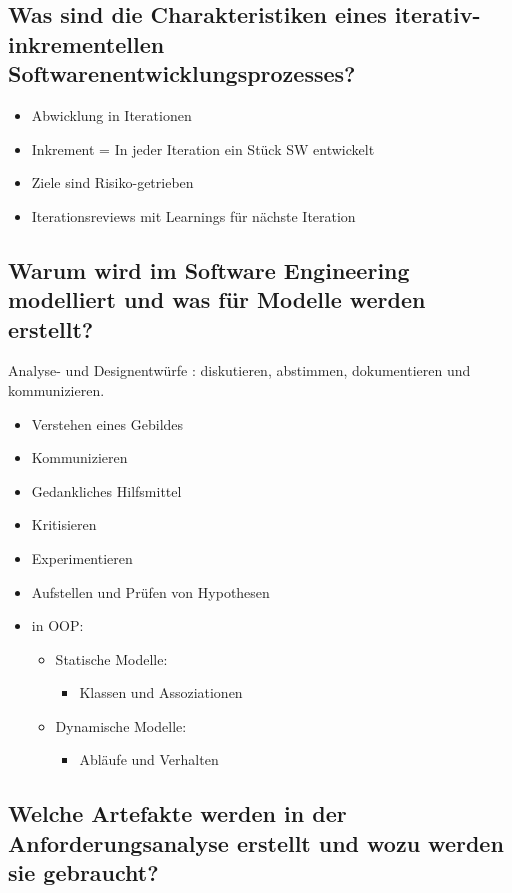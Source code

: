 \documentclass{article}
\begin{document}
\subsection{Was sind die Charakteristiken eines iterativ-inkrementellen Softwarenentwicklungsprozesses?}
\begin{itemize}
	\item Abwicklung in Iterationen
	\item Inkrement = In jeder Iteration ein Stück SW entwickelt
	\item Ziele sind Risiko-getrieben
	\item Iterationsreviews mit Learnings für nächste Iteration
\end{itemize}



\subsection{Warum wird im Software Engineering modelliert und was für Modelle werden erstellt?}
Analyse- und Designentwürfe : diskutieren, abstimmen, dokumentieren und kommunizieren. \\
\begin{itemize}
	\item Verstehen eines Gebildes
	\item  Kommunizieren
	\item Gedankliches Hilfsmittel
	\item Kritisieren
	\item Experimentieren
	\item Aufstellen und Prüfen von Hypothesen
	\item in OOP: 
	\begin{itemize}
		\item Statische Modelle:
		\begin{itemize}
			\item Klassen und Assoziationen
		\end{itemize}
		\item Dynamische Modelle:
		\begin{itemize}
			\item Abläufe und Verhalten
		\end{itemize}
	\end{itemize}
\end{itemize}



\subsection{Welche Artefakte werden in der Anforderungsanalyse erstellt und wozu werden sie gebraucht?}
\end{document}
